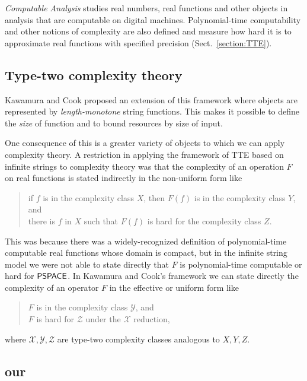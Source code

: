\documentclass[envcountsame,orivec,oribibl]{llncs}
\begin{document}
\emph{Computable Analysis} 
\cite{ko1991complexity,weihrauch00:_comput_analy}
studies real numbers, real functions and other objects in analysis
that are computable on digital machines. 
Polynomial-time computability and other notions of complexity 
are also defined and measure how hard it is to approximate real functions
with specified precision  (Sect.~\ref{section:TTE}). 

\subsection{Type-two complexity theory}

Kawamura and Cook \cite{kawamura2012complexity}
proposed an extension of this framework 
where objects are represented by \emph{length-monotone} string functions. 
This makes it possible to define the
\emph{size} of function and to bound resources by size of input.

One consequence of this is
a greater variety of objects to which we can apply complexity theory. 
A restriction in applying the framework of TTE based on infinite strings
to complexity theory was that 
the complexity of an operation $F$ on real functions
is stated indirectly in the non-uniform form like
\begin{quote}
 if $f$ is in the complexity class $X$,
 then $F(f)$ is in the complexity class $Y$, and \\
 there is $f$ in $X$ such that $F(f)$ is hard for
 the complexity class $Z$.
\end{quote}
This was because 
there was a widely-recognized definition of polynomial-time computable 
real functions whose domain is compact, 
but in the infinite string model we were not able to state
directly that $F$ is polynomial-time computable or hard for $\mathsf{PSPACE}$.
In Kawamura and Cook's framework we can state directly the complexity of
 an operator $F$ in the effective or uniform form like
\begin{quote}
 $F$ is in the complexity class $\mathcal Y$, and \\
 $F$ is hard for $\mathcal Z$ under the $\mathcal X$ reduction,
\end{quote}
where $\mathcal{X, Y, Z}$ are type-two complexity classes analogous to ${X, Y, Z}$.

\subsection{our}
\end{document}
